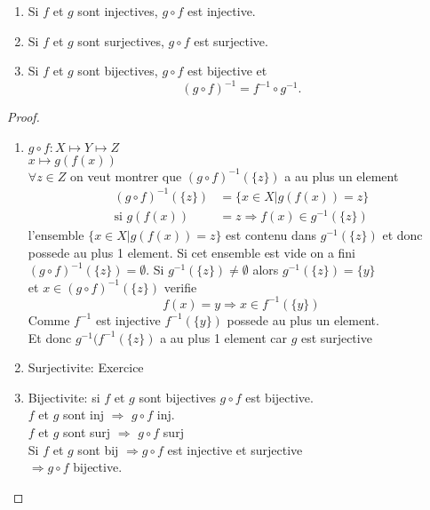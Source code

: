 \documentclass[../main.tex]{subfiles}
\begin{document}
\begin{lemma}\label{lemma:composition_d_applications_surjectives_et_injectives}
\begin{enumerate}
	\item Si $f$ et $g$ sont injectives, $g\circ f$ est injective.\\
	\item Si $f$ et $g$ sont surjectives, $g\circ f$ est surjective.\\
	\item Si $f$ et $g$ sont bijectives, $g\circ f$ est bijective et
		\[ 
			( g \circ f)^{-1} = f^{-1} \circ g^{-1}.
		\]
		
\end{enumerate}
\end{lemma}
\begin{proof}
\begin{enumerate}
	\item $g \circ f : X \mapsto Y \mapsto Z$ \\
		$x \mapsto g(f(x))$ \\
		$\forall z \in Z$ on veut montrer que $ ( g\circ f)^{-1} ( \{z\})$ a au plus un element
		\begin{align*}
			( g \circ f)^{-1}(\{z\}) &= \{x \in X \vert g(f(x)) = z\}\\
			\text{si } g(f(x)) &= z \Rightarrow f(x) \in g^{-1}(\{z\})
		\end{align*}
		l'ensemble $\{x \in X \vert g(f(x)) = z\}$ est contenu dans $g^{-1}(\{z\})$ et donc possede au plus 1 element.
		Si cet ensemble est vide on a fini $ ( g \circ f)^{-1} ( \{z\}) = \emptyset$.
		Si $g^{-1}(\{z\}) \neq \emptyset$ alors $g^{-1} ( \{z\}) = \{y\}$\\
		et $x \in ( g\circ f)^{-1} ( \{z\})$ verifie
		\[ 
			f(x) = y \Rightarrow x \in f^{-1}(\{y\})
		\]
		Comme $f^{-1}$ est injective $f^{-1}(\{y\})$ possede au plus un element.\\
		Et donc $g^{-1}(f^{-1}(\{z\})$ a au plus 1 element car $g$ est surjective\\
	\item Surjectivite: Exercice\\
	\item Bijectivite: si $f$ et $g$ sont bijectives $g\circ f$ est bijective.\\
		$f$ et $g$ sont inj $\Rightarrow$  $g\circ f$ inj.\\
		$f$ et $g$ sont surj $\Rightarrow$ $g\circ f$ surj\\
		Si $f$ et $g$ sont bij $\Rightarrow g\circ f$ est injective et surjective\\
		$\Rightarrow g \circ f$ bijective.
\end{enumerate}
\end{proof}
\end{document}
